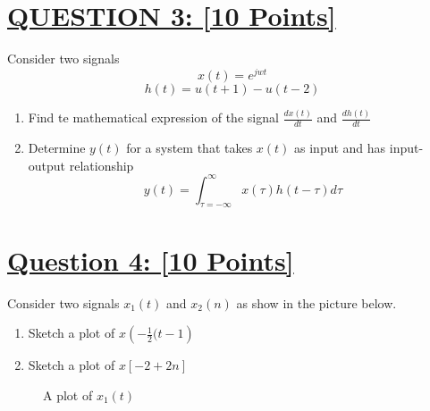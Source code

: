 \documentclass{article}
\begin{document}
\section*{\underline{QUESTION 3: [10 Points]}}

Consider two signals $$x(t) = e^{jwt}$$ $$h(t)=u(t+1)-u(t-2)$$

\begin{enumerate}
	\item Find te mathematical expression of the signal $\frac{dx(t)}{dt}$ and $\frac{dh(t)}{dt}$
	\item Determine $y(t)$ for a system that takes $x(t)$ as input and has input-output relationship $$y(t)=\int^\infty_{\tau=-\infty}x(\tau)h(t-\tau)d\tau$$
\end{enumerate}

\section*{\underline{Question 4: [10 Points]}}

Consider two signals $x_1(t)$ and $x_2(n)$ as show in the picture below.

\begin{enumerate}
	\item Sketch a plot of $x\left(-\frac12(t-1\right)$
	\item Sketch a plot of $x\left[-2 + 2n \right]$
\end{enumerate}

\begin{figure}[htbp]
\centering
{}
\caption{A plot of $x_1(t)$}
\label{fig:x1}
\end{figure}
\end{document}
